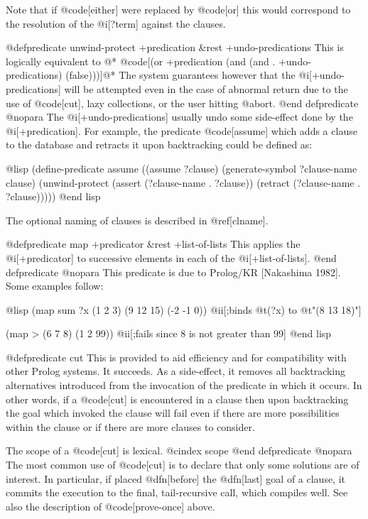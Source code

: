 {Note that if @code[either] were replaced by @code[or] this would correspond to
the resolution of the @i[?term] against the clauses.

@defpredicate unwind-protect +predication &rest +undo-predications
This is logically equivalent to @*
@code[(or +predication (and (and . +undo-predications) (false)))]@*
The system guarantees however that the @i[+undo-predications]
will be attempted even in the case of
abnormal return due to the use of @code[cut],
lazy collections, or the user hitting @abort.
@end defpredicate
@nopara
The @i[+undo-predications] usually undo some side-effect done by the @i[+predication].
For example, the predicate @code[assume] which
adds a clause to the database and
retracts it upon backtracking could be defined as:

@lisp
(define-predicate assume
  ((assume ?clause)
   (generate-symbol ?clause-name clause)
   (unwind-protect (assert (?clause-name . ?clause))
                   (retract (?clause-name . ?clause)))))
@end lisp

The optional naming of clauses is described in @ref[clname].

@defpredicate map +predicator &rest +list-of-lists
This applies the @i[+predicator] to successive elements in each of the
@i[+list-of-lists].
@end defpredicate
@nopara
This predicate is due to Prolog/KR [Nakashima 1982].
Some examples follow:

@lisp
(map sum ?x (1 2 3) (9 12 15) (-2 -1 0)) @ii[;binds @t(?x) to @t"(8 13 18)"]

(map > (6 7 8) (1 2 99)) @ii[;fails since 8 is not greater than 99]
@end lisp

@defpredicate cut
This is provided to aid efficiency and for compatibility with other
Prolog systems.  It succeeds.  As a side-effect, it removes all
backtracking alternatives introduced from the invocation of the
predicate in which it occurs.  In other words, if a @code[cut] is
encountered in a clause then upon backtracking the goal which invoked
the clause will fail even if there are more possibilities within the
clause or if there are more clauses to consider.

The scope of a @code[cut] is lexical.
@cindex scope
@end defpredicate
@nopara
The most common use of @code[cut] is to declare that only some solutions are of
interest.  In particular, if placed @dfn[before] the @dfn[last] goal of a clause,
it commits the execution to the final, tail-recursive call, which compiles
well.  See also the description of @code[prove-once] above.

}
